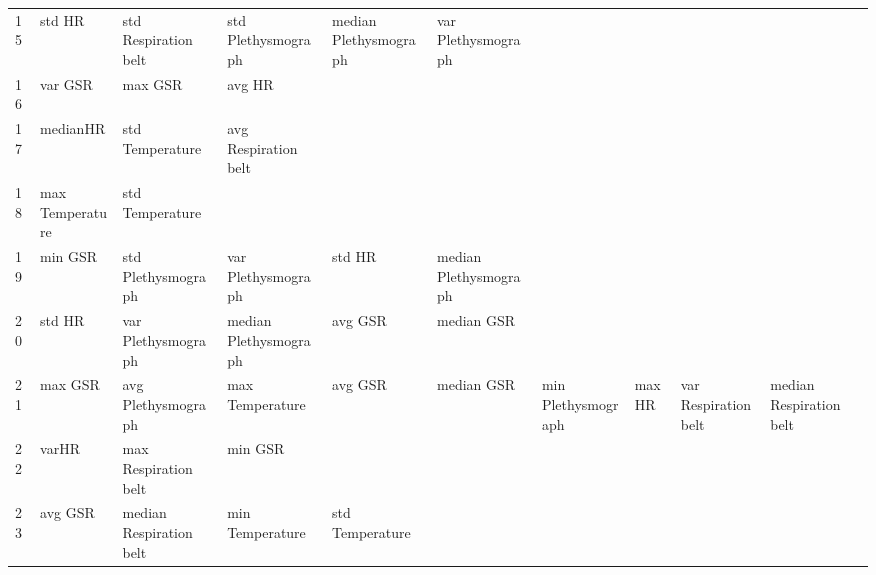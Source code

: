 \begin{landscape}
\begin{table}[]
\begin{tabular}{l|llllllll}
15       & std HR                  & std Respiration belt    & std Plethysmograph      & median Plethysmograph   & var Plethysmograph      &                       &                         &                         &                         &         \\
16       & var GSR                 & max GSR                 & avg HR                  &                         &                         &                       &                         &                         &                         &         \\
17       & medianHR                & std Temperature         & avg Respiration belt    &                         &                         &                       &                         &                         &                         &         \\
18       & max Temperature         & std Temperature         &                         &                         &                         &                       &                         &                         &                         &         \\
19       & min GSR                 & std Plethysmograph      & var Plethysmograph      & std HR                  & median Plethysmograph   &                       &                         &                         &                         &         \\
20       & std HR                  & var Plethysmograph      & median Plethysmograph   & avg GSR                 & median GSR              &                       &                         &                         &                         &         \\
21       & max GSR                 & avg Plethysmograph      & max Temperature         & avg GSR                 & median GSR              & min Plethysmograph    & maxHR                   & var Respiration belt    & median Respiration belt &         \\
22       & varHR                   & max Respiration belt    & min GSR                 &                         &                         &                       &                         &                         &                         &         \\
23       & avg GSR                 & median Respiration belt & min Temperature         & std Temperature         &                         &                       &                         &                         &                         &         \\

\end{tabular}
\end{table}
\end{landscape}
